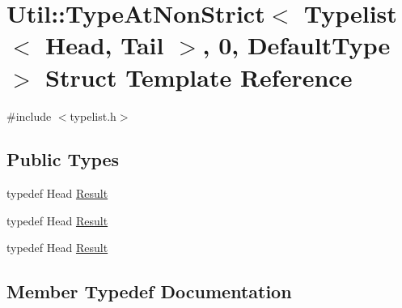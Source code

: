 \hypertarget{structUtil_1_1TL_1_1TypeAtNonStrict_3_01Typelist_3_01Head_00_01Tail_01_4_00_010_00_01DefaultType_01_4}{}\section{Util\+:\+:Type\+At\+Non\+Strict$<$ Typelist$<$ Head, Tail $>$, 0, Default\+Type $>$ Struct Template Reference}
\label{structUtil_1_1TL_1_1TypeAtNonStrict_3_01Typelist_3_01Head_00_01Tail_01_4_00_010_00_01DefaultType_01_4}


{\ttfamily \#include $<$typelist.\+h$>$}

\subsection*{Public Types}
\begin{DoxyCompactItemize}
\item 
typedef Head \mbox{\hyperlink{structUtil_1_1TL_1_1TypeAtNonStrict_3_01Typelist_3_01Head_00_01Tail_01_4_00_010_00_01DefaultType_01_4_a436fb34f639a42264d429c417d21785a}{Result}}
\item 
typedef Head \mbox{\hyperlink{structUtil_1_1TL_1_1TypeAtNonStrict_3_01Typelist_3_01Head_00_01Tail_01_4_00_010_00_01DefaultType_01_4_a436fb34f639a42264d429c417d21785a}{Result}}
\item 
typedef Head \mbox{\hyperlink{structUtil_1_1TL_1_1TypeAtNonStrict_3_01Typelist_3_01Head_00_01Tail_01_4_00_010_00_01DefaultType_01_4_a436fb34f639a42264d429c417d21785a}{Result}}
\end{DoxyCompactItemize}


\subsection{Member Typedef Documentation}
\mbox{\label{structUtil_1_1TL_1_1TypeAtNonStrict_3_01Typelist_3_01Head_00_01Tail_01_4_00_010_00_01DefaultType_01_4_a436fb34f639a42264d429c417d21785a}} 
